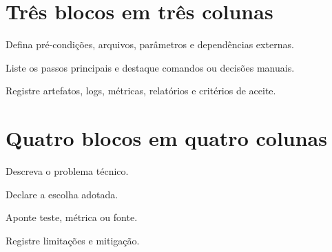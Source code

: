 \section{Três blocos em três colunas}

\noindent\begin{minipage}[t]{0.31\textwidth}
\begin{VSProcedure}[title={Entrada}]
Defina pré-condições, arquivos, parâmetros e dependências externas.
\end{VSProcedure}
\end{minipage}\hfill
\begin{minipage}[t]{0.31\textwidth}
\begin{VSProcedure}[title={Processo}]
Liste os passos principais e destaque comandos ou decisões manuais.
\end{VSProcedure}
\end{minipage}\hfill
\begin{minipage}[t]{0.31\textwidth}
\begin{VSProcedure}[title={Saída}]
Registre artefatos, logs, métricas, relatórios e critérios de aceite.
\end{VSProcedure}
\end{minipage}

\section{Quatro blocos em quatro colunas}

\noindent\begin{minipage}[t]{0.235\textwidth}
\begin{VSNote}[title={Contexto}]
\small Descreva o problema técnico.
\end{VSNote}
\end{minipage}\hfill
\begin{minipage}[t]{0.235\textwidth}
\begin{VSNote}[title={Decisão}]
\small Declare a escolha adotada.
\end{VSNote}
\end{minipage}\hfill
\begin{minipage}[t]{0.235\textwidth}
\begin{VSNote}[title={Evidência}]
\small Aponte teste, métrica ou fonte.
\end{VSNote}
\end{minipage}\hfill
\begin{minipage}[t]{0.235\textwidth}
\begin{VSNote}[title={Risco}]
\small Registre limitações e mitigação.
\end{VSNote}
\end{minipage}
